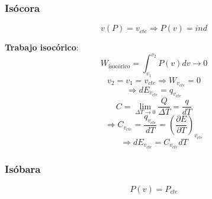         \subsubsection{Isócora}
        
        \begin{equation}
            v(P) = v_{cte} \Rightarrow P(v) = ind
        \end{equation}
        
        \textbf{Trabajo isocórico}:
        \begin{equation}
            W_{\text{isocórico}}=\int_{v_{1}}^{v_{2}} P(v)dv \rightarrow 0
        \end{equation}
        \[v_{2} = v_{1} = v_{cte} \Rightarrow  W_{v_{cte}} = 0\]
        \begin{equation}
        \Rightarrow dE_{v_{cte}} = q_{v_{cte}}
        \end{equation}
        \[C = \lim_{\Delta T\rightarrow 0} \frac{Q}{\Delta T} = \frac{q}{dT}\]
        \[\Rightarrow C_{v_{cte}} = \frac{q_{v_{cte}}}{dT} = \left ( \frac{\partial E}{\partial T}\right )_{v_{cte}} \]
        \begin{equation}
            \Rightarrow dE_{v_{cte}} = C_{v_{cte}}dT
        \end{equation}
        
        \subsubsection{Isóbara}
        
        \begin{equation}
            P(v) = P_{cte}
        \end{equation}
        

